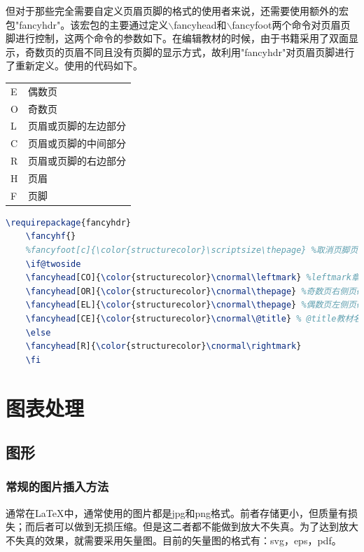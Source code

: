 \documentclass[12pt]{book}
\begin{document}
但对于那些完全需要自定义页眉页脚的格式的使用者来说，还需要使用额外的宏包"fancyhdr"。该宏包的主要通过定义$\backslash$fancyhead和$\backslash$fancyfoot两个命令对页眉页脚进行控制，这两个命令的参数如下。在编辑教材的时候，由于书籍采用了双面显示，奇数页的页眉不同且没有页脚的显示方式，故利用"fancyhdr"对页眉页脚进行了重新定义。使用的代码如下。
\begin{table}[h]
    \centering
    \begin{tabular}{ll}
        E &     偶数页\\
        O &     奇数页 \\
        L &     页眉或页脚的左边部分\\
        C &     页眉或页脚的中间部分\\
        R &     页眉或页脚的右边部分\\
        H &     页眉\\
        F &     页脚
    \end{tabular}
\end{table}
\begin{lstlisting}[language=tex,breaklines]
    \requirepackage{fancyhdr}
    \fancyhf{} 
    %fancyfoot[c]{\color{structurecolor}\scriptsize\thepage} %取消页脚页码
    \if@twoside
    \fancyhead[CO]{\color{structurecolor}\cnormal\leftmark} %leftmark章节名称，奇数页页眉中部显示章节名称
    \fancyhead[OR]{\color{structurecolor}\cnormal\thepage} %奇数页右侧页码
    \fancyhead[EL]{\color{structurecolor}\cnormal\thepage} %偶数页左侧页码
    \fancyhead[CE]{\color{structurecolor}\cnormal\@title} % @title教材名称，偶数页页眉中部显示教材名称
    \else
    \fancyhead[R]{\color{structurecolor}\cnormal\rightmark}
    \fi
\end{lstlisting}



\chapter{图表处理}

\section{图形}


\subsection{常规的图片插入方法}

通常在\LaTeX{}中，通常使用的图片都是jpg和png格式。前者存储更小，但质量有损失；而后者可以做到无损压缩。但是这二者都不能做到放大不失真。为了达到放大不失真的效果，就需要采用矢量图。目前的矢量图的格式有：svg，eps，pdf。
\end{document}
